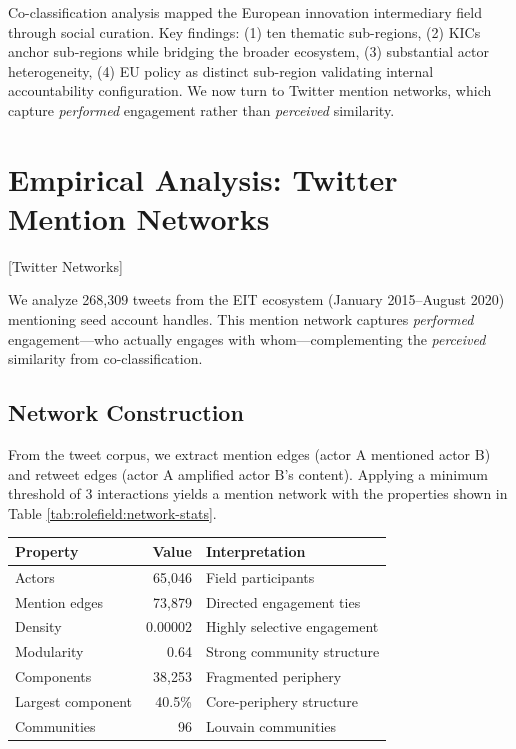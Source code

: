 \documentclass[../main.tex]{subfiles}
\begin{document}
Co-classification analysis mapped the European innovation intermediary field through social curation. Key findings: (1) ten thematic sub-regions, (2) KICs anchor sub-regions while bridging the broader ecosystem, (3) substantial actor heterogeneity, (4) EU policy as distinct sub-region validating internal accountability configuration. We now turn to Twitter mention networks, which capture \textit{performed} engagement rather than \textit{perceived} similarity.


\section{Empirical Analysis: Twitter Mention Networks}[Twitter Networks]

We analyze 268,309 tweets from the EIT ecosystem (January 2015--August 2020) mentioning seed account handles. This mention network captures \textit{performed} engagement---who actually engages with whom---complementing the \textit{perceived} similarity from co-classification.

\subsection{Network Construction}

From the tweet corpus, we extract mention edges (actor A mentioned actor B) and retweet edges (actor A amplified actor B's content). Applying a minimum threshold of 3 interactions yields a mention network with the properties shown in Table \ref{tab:rolefield:network-stats}.

\begin{center}
\small
\begin{tabular}{lrl}
\toprule
\textbf{Property} & \textbf{Value} & \textbf{Interpretation} \\
\midrule
Actors & 65,046 & Field participants \\
Mention edges & 73,879 & Directed engagement ties \\
Density & 0.00002 & Highly selective engagement \\
Modularity & 0.64 & Strong community structure \\
Components & 38,253 & Fragmented periphery \\
Largest component & 40.5\% & Core-periphery structure \\
Communities & 96 & Louvain communities \\
\bottomrule
\end{tabular}
\end{center}
\end{document}
